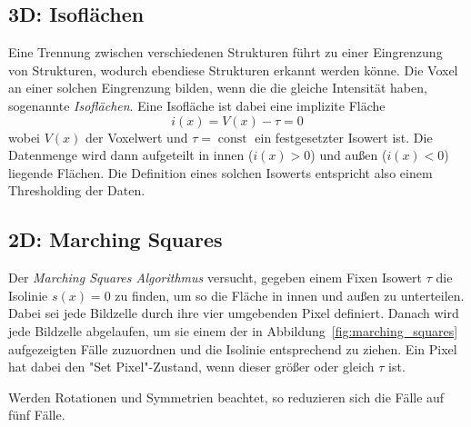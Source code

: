 \documentclass[a4paper, 11pt, accentcolor = tud3b]{tudreport}
\DeclareMathOperator{\const}{const}
\begin{document}
			\subsection{3D: Isoflächen}
				Eine Trennung zwischen verschiedenen Strukturen führt zu einer Eingrenzung von Strukturen, wodurch ebendiese Strukturen erkannt werden könne. Die Voxel an einer solchen Eingrenzung bilden, wenn die die gleiche Intensität haben, sogenannte \emph{Isoflächen}. Eine Isofläche ist dabei eine implizite Fläche
				\begin{equation*}
					i(x) = V(x) - \tau = 0
				\end{equation*}
				wobei \( V(x) \) der Voxelwert und \( \tau = \const \) ein festgesetzter Isowert ist. Die Datenmenge wird dann aufgeteilt in innen (\( i(x) > 0 \)) und außen (\( i(x) < 0 \)) liegende Flächen. Die Definition eines solchen Isowerts entspricht also einem Thresholding der Daten.

			\subsection{2D: Marching Squares}
				Der \emph{Marching Squares Algorithmus} versucht, gegeben einem Fixen Isowert \( \tau \) die Isolinie \( s(x) = 0 \) zu finden, um so die Fläche in innen und außen zu unterteilen. Dabei sei jede Bildzelle durch ihre vier umgebenden Pixel definiert. Danach wird jede Bildzelle abgelaufen, um sie einem der in Abbildung~\ref{fig:marching_squares} aufgezeigten Fälle zuzuordnen und die Isolinie entsprechend zu ziehen. Ein Pixel hat dabei den "Set Pixel"-Zustand, wenn dieser größer oder gleich \( \tau \) ist.
				
				Werden Rotationen und Symmetrien beachtet, so reduzieren sich die Fälle auf fünf Fälle.
				
\end{document}
